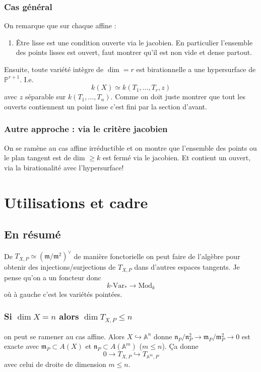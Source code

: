 \documentclass[a4paper,12pt]{book}
\newcommand{\A}{\mathbb{A}}
\newcommand{\m}{\mathfrak{m}}
\newcommand{\n}{\mathfrak{n}}
\renewcommand{\Pr}{\mathbb{P}}
\theoremstyle{plain}
\theoremstyle{definition}
\theoremstyle{remark}
\begin{document}
\subsection{Cas général}
On remarque que sur chaque affine :
\begin{enumerate}
    \item Être lisse est une condition ouverte via le jacobien.
        En particulier l'ensemble des points lisses est ouvert,
        faut montrer qu'il est non vide et dense partout.
\end{enumerate}
Ensuite, toute variété intègre de $\dim = r$ est birationnelle a
une hypersurface
de $\Pr^{r+1}$. I.e. \[k(X)\simeq k(T_1,\ldots, T_r, z)\] avec $z$
séparable sur $k(T_1,\ldots, T_n)$. Comme on doit juste montrer
que tout les ouverts contiennent un point lisse c'est fini 
par la section d'avant.

\subsection{Autre approche : via le critère jacobien}
On se ramène au cas affine irréductible et on montre que l'ensemble
des points ou le plan tangent est de dim $\geq k$ est fermé via le
jacobien. Et contient un ouvert, via la birationalité avec 
l'hypersurface!

\chapter{Utilisations et cadre}
\section{En résumé}
De $T_{X,P}\simeq (\m/\m^2)^\vee$ de manière fonctorielle on peut
faire de l'algèbre pour obtenir des injections/surjections de 
$T_{X,P}$ dans d'autres espaces tangents. Je pense qu'on a un
foncteur donc 
\[k\textrm{-Var}_*\to \textrm{Mod}_k\]
où à gauche c'est les variétés pointées.

\subsection{Si $\dim X=n$ alors $\dim T_{X,P}\leq n$}
on peut se ramener au cas affine. Alors $X\hookrightarrow \A^n$
donne $\n_P/\n_P^2\to \m_P/\m_P^2\to 0$ est exacte avec
$\m_P\subset A(X)$ et $\n_P\subset A(\A^m)$ ($m\leq n$). Ça donne
\[0\to T_{X,P}\hookrightarrow T_{\A^m,P}\]
avec celui de droite de dimension $m\leq n$.
\end{document}
